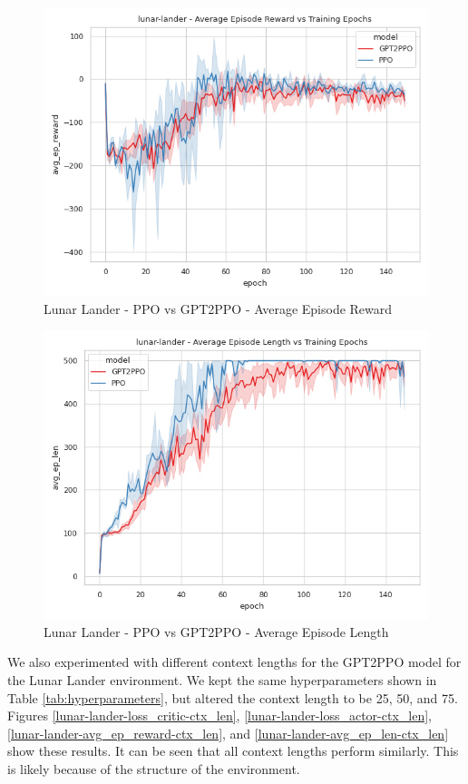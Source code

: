 \begin{figure}[htbp]
    \centerline{\includegraphics[width=\columnwidth]{./img/lunar-lander-avg_ep_reward-model.png}}
    \caption{Lunar Lander - PPO vs GPT2PPO - Average Episode Reward}
    \label{lunar-lander-avg_ep_reward-model}
\end{figure}
\begin{figure}[htbp]
    \centerline{\includegraphics[width=\columnwidth]{./img/lunar-lander-avg_ep_len-model.png}}
    \caption{Lunar Lander - PPO vs GPT2PPO - Average Episode Length}
    \label{lunar-lander-avg_ep_len-model}
\end{figure}


We also experimented with different context lengths for the GPT2PPO model for the Lunar Lander environment.
We kept the same hyperparameters shown in Table \ref{tab:hyperparameters}, but altered the context length to be 25, 50, and 75.
Figures \ref{lunar-lander-loss_critic-ctx_len}, \ref{lunar-lander-loss_actor-ctx_len}, \ref{lunar-lander-avg_ep_reward-ctx_len}, and
\ref{lunar-lander-avg_ep_len-ctx_len} show these results. It can be seen that all context lengths perform similarly. This is likely because
of the structure of the environment.

